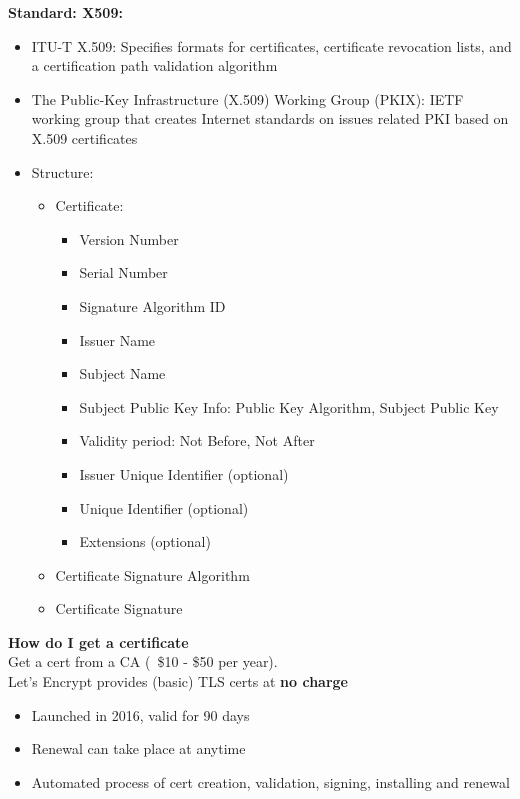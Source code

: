 \documentclass[10pt,landscape]{article}
\begin{document}
\begin{multicols*}{3}
\textbf{Standard: X509:} \\
\begin{itemize}[noitemsep,wide=0pt, leftmargin=\dimexpr{} + 2\relax]
    \item ITU-T X.509:
    Specifies formats for certificates, certificate revocation lists,
    and a certification path validation algorithm
    \item The Public-Key Infrastructure (X.509) Working Group (PKIX):
    IETF working group that creates Internet standards on issues
    related PKI based on X.509 certificates
    \item Structure: 
    \begin{itemize}[noitemsep,wide=0pt, leftmargin=\dimexpr{} + 2\relax]
        \item Certificate:
        \begin{multicols}{2}
            \noindent
            \begin{itemize}[noitemsep,wide=0pt, leftmargin=\dimexpr{} + 2\relax]
                \item Version Number
                \item Serial Number
                \item Signature Algorithm ID
                \item Issuer Name
                \item Subject Name
                \item Subject Public Key Info: Public Key Algorithm, Subject Public Key
                \item Validity period: Not Before, Not After
                \item Issuer Unique Identifier (optional)
                \item Unique Identifier (optional)
                \item Extensions (optional)
            \end{itemize}
        \end{multicols}
        \item Certificate Signature Algorithm
        \item Certificate Signature
    \end{itemize}
\end{itemize}

\textbf{How do I get a certificate} \\
Get a cert from a CA (~\$10 - \$50 per year). \\ 
Let's Encrypt provides (basic) TLS certs at \textbf{no charge}
\begin{itemize}[noitemsep,wide=0pt, leftmargin=\dimexpr{} + 2\relax]
    \item Launched in 2016, valid for 90 days
    \item Renewal can take place at anytime
    \item Automated process of cert creation, validation, signing, installing and renewal
\end{itemize}


\end{multicols*}
\end{document}

